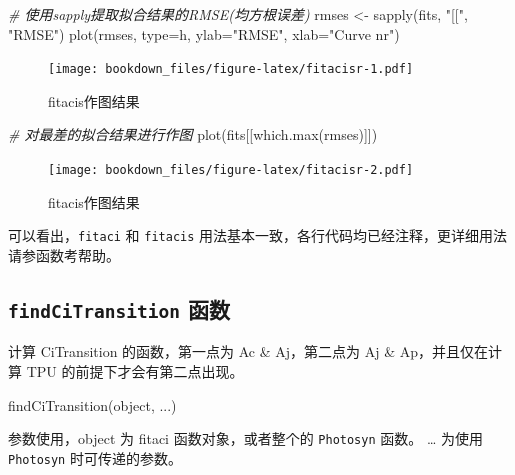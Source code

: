 \documentclass[
]{krantz}
\makeatletter
\newenvironment{Shaded}{\begin{snugshade}}{\end{snugshade}}
\newcommand{\AttributeTok}[1]{\textcolor[rgb]{0.77,0.63,0.00}{#1}}
\newcommand{\CommentTok}[1]{\textcolor[rgb]{0.56,0.35,0.01}{\textit{#1}}}
\newcommand{\FunctionTok}[1]{\textcolor[rgb]{0.00,0.00,0.00}{#1}}
\newcommand{\NormalTok}[1]{#1}
\newcommand{\OtherTok}[1]{\textcolor[rgb]{0.56,0.35,0.01}{#1}}
\newcommand{\StringTok}[1]{\textcolor[rgb]{0.31,0.60,0.02}{#1}}
\newenvironment{kframe}{%
\medskip{}
\setlength{\fboxsep}{.8em}
 \def\at@end@of@kframe{}%
 \ifinner\ifhmode%
  \def\at@end@of@kframe{\end{minipage}}%
  \begin{minipage}{\columnwidth}%
 \fi\fi%
 \def\FrameCommand##1{\hskip\@totalleftmargin \hskip-\fboxsep
 \colorbox{shadecolor}{##1}\hskip-\fboxsep
     \hskip-\linewidth \hskip-\@totalleftmargin \hskip\columnwidth}%
 \MakeFramed {\advance\hsize-\width
   \@totalleftmargin\z@ \linewidth\hsize
   \@setminipage}}%
 {\par\unskip\endMakeFramed%
 \at@end@of@kframe}
\renewenvironment{Shaded}{\begin{kframe}}{\end{kframe}}
\makeatother
\begin{document}
\begin{Shaded}
\begin{Highlighting}[]
\CommentTok{\# 使用sapply提取拟合结果的RMSE(均方根误差)}
\NormalTok{rmses }\OtherTok{\textless{}{-}} \FunctionTok{sapply}\NormalTok{(fits, }\StringTok{"[["}\NormalTok{, }\StringTok{"RMSE"}\NormalTok{)}
\FunctionTok{plot}\NormalTok{(rmses, }\AttributeTok{type=}\StringTok{\textquotesingle{}h\textquotesingle{}}\NormalTok{, }\AttributeTok{ylab=}\StringTok{"RMSE"}\NormalTok{, }\AttributeTok{xlab=}\StringTok{"Curve nr"}\NormalTok{)}
\end{Highlighting}
\end{Shaded}

\begin{figure}
\centering
\texttt{[image: bookdown\_files/figure-latex/fitacisr-1.pdf]}
\caption{\label{fig:fitacisr-1}fitacis作图结果}
\end{figure}

\begin{Shaded}
\begin{Highlighting}[]
\CommentTok{\# 对最差的拟合结果进行作图}
\FunctionTok{plot}\NormalTok{(fits[[}\FunctionTok{which.max}\NormalTok{(rmses)]])}
\end{Highlighting}
\end{Shaded}

\begin{figure}
\centering
\texttt{[image: bookdown\_files/figure-latex/fitacisr-2.pdf]}
\caption{\label{fig:fitacisr-2}fitacis作图结果}
\end{figure}

可以看出，\texttt{fitaci} 和 \texttt{fitacis} 用法基本一致，各行代码均已经注释，更详细用法请参函数考帮助。

\hypertarget{transition}{%
\subsection{\texorpdfstring{\texttt{findCiTransition} 函数}{findCiTransition 函数}}\label{transition}}

计算 CiTransition 的函数，第一点为 Ac \& Aj，第二点为 Aj \& Ap，并且仅在计算 TPU 的前提下才会有第二点出现。

\begin{Shaded}
\begin{Highlighting}[]
\FunctionTok{findCiTransition}\NormalTok{(object, ...)}
\end{Highlighting}
\end{Shaded}

参数使用，object 为 fitaci 函数对象，或者整个的 \texttt{Photosyn} 函数。
\ldots{} 为使用 \texttt{Photosyn} 时可传递的参数。
\end{document}
